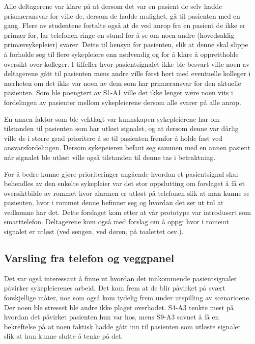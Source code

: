 \noindent
Alle deltagerene var klare på at dersom det var en pasient de selv hadde prismæransvar for ville de, dersom de hadde mulighet, gå til pasienten med en gang.
Flere av studentene fortalte også at de ved anrop fra en pasient de ikke er primær for, lar telefonen ringe en stund for å se om noen andre (hovedsaklig primærsykepleier) svarer. Dette til hensyn for pasienten, slik at denne skal slippe å forholde seg til flere sykepleiere enn nødvendig og for å klare å opprettholde oversikt over kolleger. I tilfeller hvor pasientsignalet ikke ble besvart ville noen av deltagerene gått til pasienten mens andre ville først hørt med eventuelle kolleger i nærheten om det ikke var noen av dem som har primæransvar for den aktuelle pasienten. Som ble poengtert av S1-A1 ville det ikke lenger være noen vits i fordelingen av pasienter mellom sykepleierene dersom alle svarer på alle anrop.

\noindent
En annen faktor som ble vektlagt var kunnskapen sykepleierene har om tilstanden til pasienten som har utløst signalet, og at dersom denne var dårlig ville de i større grad prioritere å se til pasienten fremfor å holde fast ved ansvarsfordelingen. 
Dersom sykepeieren befant seg sammen med en annen pasient når signalet ble utløst ville også tilstanden til denne tas i betraktning. 

\noindent
For å bedre kunne gjøre prioriteringer angående hvordan et pasientsignal skal behendles av den enkelte sykepleier var det stor oppslutting om forslaget å få et oversiktbilde av rommet hvor alarmen er utløst på telefonen slik at man kunne se pasienten, hvor i rommet denne befinner seg og hvordan det ser ut tul at vedkomne har det. Dette forslaget kom etter at vår prototype var introdusert som smarttelefon. Deltagerene kom også med forslag om å oppgi hvor i romemt signalet er utløst (ved sengen, ved døren, på toalettet osv.).

\subsection{Varsling fra telefon og veggpanel}

Det var også interessant å finne ut hvordan det innkommende pasientsignalet påvirker sykepleierenes arbeid. Det kom frem at de blir påvirket på svært forskjellige måter, noe som også kom tydelig frem under utspilling av scenarioene.
Der noen ble stresset ble andre ikke plaget overhodet. S4-A3 tenkte mest på hvordan det påvirket pasienten hun var hos, mens S9-A3 savnet å få en bekreftelse på at noen faktisk hadde gått inn til pasienten som utløste signalet slik at hun kunne slutte å tenke på det. 

